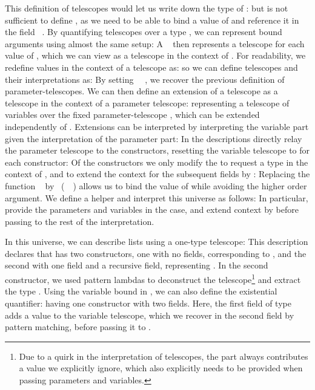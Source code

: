 This definition of telescopes would let us write down the type of :
but is not sufficient to define , as we need to be able to bind a value  of  and reference it in the field \ . By quantifying telescopes over a type \cite{practgen}, we can represent bound arguments using almost the same setup:
A \  then represents a telescope for each value of , which we can view as a telescope in the context of . For readability, we redefine values in the context of a telescope as:
so we can define telescopes and their interpretations as:
By setting \ \AV{=}\ , we recover the previous definition of parameter-telescopes. We can then define an extension of a telescope as a telescope in the context of a parameter telescope:
representing a telescope of variables over the fixed parameter-telescope , which can be extended independently of . Extensions can be interpreted by interpreting the variable part given the interpretation of the parameter part:
In the descriptions directly relay the parameter telescope to the constructors, resetting the variable telescope to  for each constructor:
Of the constructors we only modify the  to request a type  in the context of , and to extend the context for the subsequent fields by :
Replacing the function \  by \ (\ \ ) allows us to bind the value of  while avoiding the higher order argument. 
We define a helper
and interpret this universe as follows:
In particular, provide  the parameters and variables in the  case, and extend context by  before passing to the rest of the interpretation.

In this universe, we can describe lists using a one-type telescope:
This description declares that  has two constructors, one with no fields, corresponding to \AIC{[]}, and the second with one field and a recursive field, representing . In the second constructor, we used pattern lambdas to deconstruct the telescope\footnote{Due to a quirk in the interpretation of telescopes, the  part always contributes a value  we explicitly ignore, which also explicitly needs to be provided when passing parameters and variables.} and extract the type .
Using the variable bound in , we can also define the existential quantifier:
having one constructor with two fields. Here, the first field of type  adds a value  to the variable telescope, which we recover in the second field by pattern matching, before passing it to .


